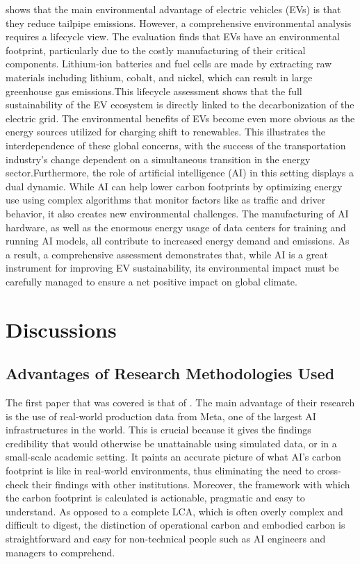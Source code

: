 \documentclass[a4paper, 12pt]{article}
\begin{document}
\par \citet{M.rauf2024} shows that the main environmental advantage of electric vehicles (EVs) is that they reduce tailpipe emissions. However, a comprehensive environmental analysis requires a lifecycle view. The evaluation finds that EVs have an environmental footprint, particularly due to the costly manufacturing of their critical components. Lithium-ion batteries and fuel cells are made by extracting raw materials including lithium, cobalt, and nickel, which can result in large greenhouse gas emissions.This lifecycle assessment shows that the full sustainability of the EV ecosystem is directly linked to the decarbonization of the electric grid.  The environmental benefits of EVs become even more obvious as the energy sources utilized for charging shift to renewables.  This illustrates the interdependence of these global concerns, with the success of the transportation industry's change dependent on a simultaneous transition in the energy sector.Furthermore, the role of artificial intelligence (AI) in this setting displays a dual dynamic.  While AI can help lower carbon footprints by optimizing energy use using complex algorithms that monitor factors like as traffic and driver behavior, it also creates new environmental challenges.  The manufacturing of AI hardware, as well as the enormous energy usage of data centers for training and running AI models, all contribute to increased energy demand and emissions.  As a result, a comprehensive assessment demonstrates that, while AI is a great instrument for improving EV sustainability, its environmental impact must be carefully managed to ensure a net positive impact on global climate.

\section{Discussions}
\subsection{Advantages of Research Methodologies Used}
The first paper that was covered is that of \citet{Wu2022}. The main advantage of their research is the use of real-world production data from Meta, one of the largest AI infrastructures in the world. This is crucial because it gives the findings credibility that would otherwise be unattainable using simulated data, or in a small-scale academic setting. It paints an accurate picture of what AI's carbon footprint is like in real-world environments, thus eliminating the need to cross-check their findings with other institutions. Moreover, the framework with which the carbon footprint is calculated is actionable, pragmatic and easy to understand. As opposed to a complete LCA, which is often overly complex and difficult to digest, the distinction of operational carbon and embodied carbon is straightforward and easy for non-technical people such as AI engineers and managers to comprehend.\hfill \break
\end{document}
